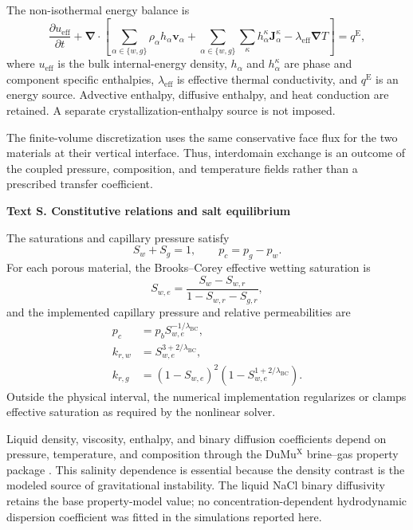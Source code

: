 \documentclass[draft,wrr]{agutexSI2019}
\newcounter{sitext}
\renewcommand{\thesitext}{S\arabic{sitext}}
\newcommand{\sitext}[1]{%
  \refstepcounter{sitext}%
  \par\medskip\noindent\textbf{Text \thesitext. #1}\par\medskip}
\begin{document}
\begin{article}
The non-isothermal energy balance is
\begin{equation}
\frac{\partial u_{\mathrm{eff}}}{\partial t}
+\boldsymbol{\nabla}\!\cdot
\left[
\sum_{\alpha\in\{w,g\}}\rho_\alpha h_\alpha\boldsymbol{v}_\alpha
+\sum_{\alpha\in\{w,g\}}\sum_\kappa
h_\alpha^\kappa\boldsymbol{J}_\alpha^\kappa
-\lambda_{\mathrm{eff}}\boldsymbol{\nabla}T
\right]=q^{\mathrm{E}},
\label{eq:si-energy}
\end{equation}
where $u_{\mathrm{eff}}$ is the bulk internal-energy density,
$h_\alpha$ and $h_\alpha^\kappa$ are phase and component specific
enthalpies, $\lambda_{\mathrm{eff}}$ is effective thermal conductivity, and
$q^{\mathrm{E}}$ is an energy source. Advective enthalpy, diffusive enthalpy,
and heat conduction are retained. A separate crystallization-enthalpy source is
not imposed.

The finite-volume discretization uses the same conservative face flux for the
two materials at their vertical interface. Thus, interdomain exchange is an
outcome of the coupled pressure, composition, and temperature fields rather
than a prescribed transfer coefficient.

\sitext{Constitutive relations and salt equilibrium}\label{app:closures}

The saturations and capillary pressure satisfy
\begin{equation}
S_w+S_g=1,
\qquad
p_c=p_g-p_w.
\label{eq:si-phase-closure}
\end{equation}
For each porous material, the Brooks--Corey effective wetting saturation is
\begin{equation}
S_{w,e}=\frac{S_w-S_{w,r}}{1-S_{w,r}-S_{g,r}},
\label{eq:si-effective-saturation}
\end{equation}
and the implemented capillary pressure and relative permeabilities are
\begin{align}
p_c &= p_b S_{w,e}^{-1/\lambda_{\mathrm{BC}}},
\label{eq:si-bc-pc}\\
k_{r,w} &= S_{w,e}^{3+2/\lambda_{\mathrm{BC}}},
\label{eq:si-bc-krw}\\
k_{r,g} &= (1-S_{w,e})^2
\left(1-S_{w,e}^{1+2/\lambda_{\mathrm{BC}}}\right).
\label{eq:si-bc-krg}
\end{align}
Outside the physical interval, the numerical implementation regularizes or
clamps effective saturation as required by the nonlinear solver.

Liquid density, viscosity, enthalpy, and binary diffusion coefficients depend
on pressure, temperature, and composition through the DuMu$^{\mathrm{X}}$
brine--gas property package \cite{koch2021}. This salinity dependence is
essential because the density contrast is the modeled source of gravitational
instability. The liquid NaCl binary diffusivity retains the base property-model
value; no concentration-dependent hydrodynamic dispersion coefficient was
fitted in the simulations reported here.


\end{article}
\end{document}
